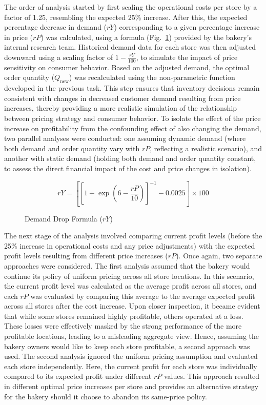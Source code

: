 \documentclass[a4paper,12pt]{article}
\begin{document}
The order of analysis started by first scaling the operational costs per store by a factor of 1.25, resembling the expected 25\% increase. After this, the expected percentage decrease in demand (\( rY \)) corresponding to a given percentage increase in price (\( rP \)) was calculated, using a formula (Fig.~\ref{fig:demand_drop}) provided by the bakery’s internal research team. Historical demand data for each store was then adjusted downward using a scaling factor of \( 1 - \frac{rY}{100} \), to simulate the impact of price sensitivity on consumer behavior. Based on the adjusted demand, the optimal order quantity (\( Q_{\text{new}} \)) was recalculated using the non-parametric function developed in the previous task. This step ensures that inventory decisions remain consistent with changes in decreased customer demand resulting from price increases, thereby providing a more realistic simulation of the relationship between pricing strategy and consumer behavior. To isolate the effect of the price increase on profitability from the confounding effect of also changing the demand, two parallel analyses were conducted: one assuming dynamic demand (where both demand and order quantity vary with \( rP \), reflecting a realistic scenario), and another with static demand (holding both demand and order quantity constant, to assess the direct financial impact of the cost and price changes in isolation).

\begin{figure}[h]
    \centering
    \caption{Demand Drop Formula (\( rY \))}
    \label{fig:demand_drop}
    \[
    rY = \left[ \left[ 1 + \exp\left(6 - \frac{rP}{10}\right) \right]^{-1} - 0.0025 \right] \times 100
    \]
\end{figure}

The next stage of the analysis involved comparing current profit levels (before the 25\% increase in operational costs and any price adjustments) with the expected profit levels resulting from different price increases (\( rP \)). Once again, two separate approaches were considered. The first analysis assumed that the bakery would continue its policy of uniform pricing across all store locations. In this scenario, the current profit level was calculated as the average profit across all stores, and each \( rP \) was evaluated by comparing this average to the average expected profit across all stores after the cost increase. Upon closer inspection, it became evident that while some stores remained highly profitable, others operated at a loss. These losses were effectively masked by the strong performance of the more profitable locations, leading to a misleading aggregate view.  Hence, assuming the bakery owners would like to keep each store profitable, a second approach was used. The second analysis ignored the uniform pricing assumption and evaluated each store independently. Here, the current profit for each store was individually compared to its expected profit under different \( rP \) values. This approach resulted in different optimal price increases per store and provides an alternative strategy for the bakery should it choose to abandon its same-price policy.
\end{document}
